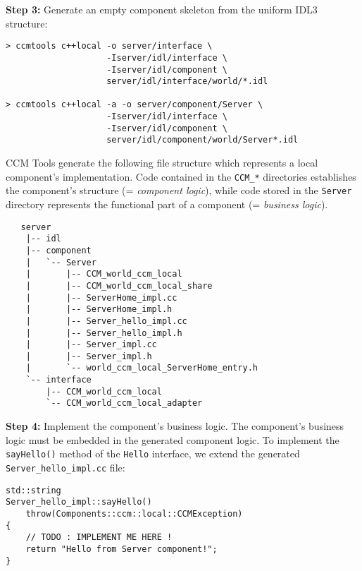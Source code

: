 \noindent
{\bf Step 3:} Generate an empty component skeleton from the uniform IDL3 
structure:
\begin{small}
\begin{verbatim}
> ccmtools c++local -o server/interface \
                    -Iserver/idl/interface \
                    -Iserver/idl/component \
                    server/idl/interface/world/*.idl

> ccmtools c++local -a -o server/component/Server \ 
                    -Iserver/idl/interface \
                    -Iserver/idl/component \
                    server/idl/component/world/Server*.idl  
\end{verbatim}
\end{small}

\noindent
CCM Tools generate the following file structure which represents a local
component's implementation.
Code contained in the {\tt CCM\_*} directories establishes the component's
structure (= {\it component logic}), while code stored in the {\tt Server} 
directory represents the functional part of a component (= {\it business
logic}).

\begin{small}
\begin{verbatim}
   server
    |-- idl
    |-- component
    |   `-- Server
    |       |-- CCM_world_ccm_local
    |       |-- CCM_world_ccm_local_share
    |       |-- ServerHome_impl.cc
    |       |-- ServerHome_impl.h
    |       |-- Server_hello_impl.cc
    |       |-- Server_hello_impl.h
    |       |-- Server_impl.cc
    |       |-- Server_impl.h
    |       `-- world_ccm_local_ServerHome_entry.h
    `-- interface
        |-- CCM_world_ccm_local
        `-- CCM_world_ccm_local_adapter
\end{verbatim}
\end{small}

\noindent
{\bf Step 4:} Implement the component's business logic.
The component's business logic must be embedded in the generated
component logic. 
To implement the {\tt sayHello()} method of the {\tt Hello} interface,
we extend the generated {\tt Server\_hello\_impl.cc} file:
\begin{small}
\begin{verbatim}
std::string
Server_hello_impl::sayHello()
    throw(Components::ccm::local::CCMException)
{
    // TODO : IMPLEMENT ME HERE !
    return "Hello from Server component!";
}
\end{verbatim}
\end{small}


